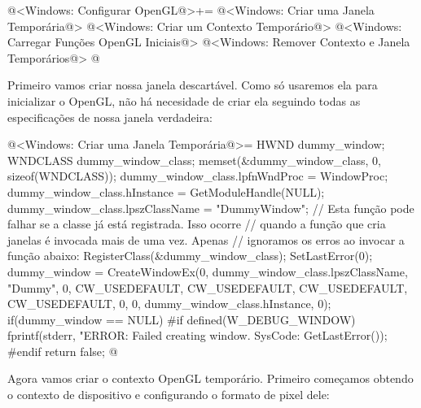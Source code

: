 \iniciocodigo
@<Windows: Configurar OpenGL@>+=
{
@<Windows: Criar uma Janela Temporária@>
@<Windows: Criar um Contexto Temporário@>
@<Windows: Carregar Funções OpenGL Iniciais@>
@<Windows: Remover Contexto e Janela Temporários@>
}
@
\fimcodigo

Primeiro vamos criar nossa janela descartável. Como só usaremos ela
para inicializar o OpenGL, não há necesidade de criar ela seguindo
todas as especificações de nossa janela verdadeira:

\iniciocodigo
@<Windows: Criar uma Janela Temporária@>=
HWND dummy_window;
{
  WNDCLASS dummy_window_class;
  memset(&dummy_window_class, 0, sizeof(WNDCLASS));
  dummy_window_class.lpfnWndProc = WindowProc;
  dummy_window_class.hInstance = GetModuleHandle(NULL);
  dummy_window_class.lpszClassName = "DummyWindow";
  // Esta função pode falhar se a classe já está registrada. Isso ocorre
  // quando a função que cria janelas é invocada mais de uma vez. Apenas
  // ignoramos os erros ao invocar a função abaixo:
  RegisterClass(&dummy_window_class);
  SetLastError(0);
  dummy_window = CreateWindowEx(0, dummy_window_class.lpszClassName, "Dummy",
                                0, CW_USEDEFAULT, CW_USEDEFAULT, CW_USEDEFAULT,
                                CW_USEDEFAULT, 0, 0,
                                dummy_window_class.hInstance, 0);
  if(dummy_window == NULL){
#if defined(W_DEBUG_WINDOW)
    fprintf(stderr, "ERROR: Failed creating window. SysCode: %
            GetLastError());
#endif
    return false;
  }
}
@
\fimcodigo

Agora vamos criar o contexto OpenGL temporário. Primeiro começamos
obtendo o contexto de dispositivo e configurando o formato de pixel
dele:

